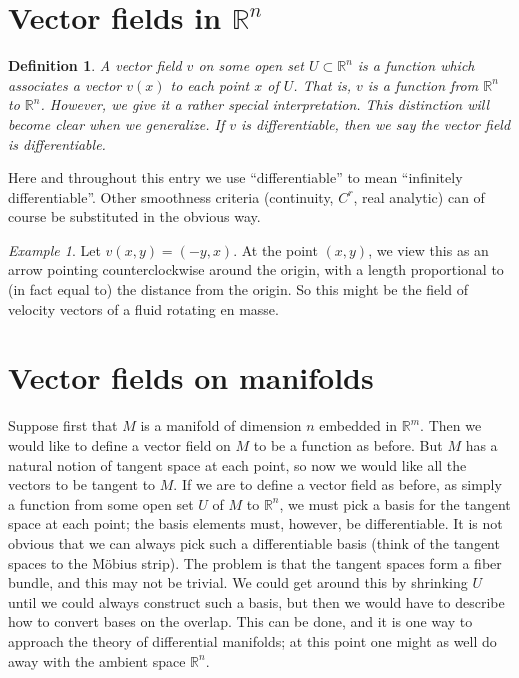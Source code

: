 \documentclass{article}
\newtheorem*{defn}{Definition}
\theoremstyle{remark}
\newtheorem*{example}{Example}
\begin{document}
\section*{Vector fields in $\mathbb{R}^n$}

\begin{defn}
A \emph{vector field} $v$ on some open set $U \subset \mathbb{R}^n$ is a function which associates a vector $v(x)$ to each point $x$ of $U$. That is, $v$ is a function from $\mathbb{R}^n$ to $\mathbb{R}^n$.  However, we give it a rather special interpretation.  This distinction will become clear when we generalize.  If $v$ is differentiable, then we say the vector field is \emph{differentiable}.
\end{defn}

Here and throughout this entry we use ``differentiable'' to mean ``infinitely differentiable''.  Other smoothness criteria (continuity, $C^r$, real analytic) can of course be substituted in the obvious way.

\begin{example}
Let $v(x,y)=(-y,x)$.  At the point $(x,y)$, we view this as an arrow pointing counterclockwise around the origin, with a length proportional to (in fact equal to) the distance from the origin.  So this might be the field of velocity vectors of a fluid rotating en masse.
\end{example}

\section*{Vector fields on manifolds}

Suppose first that $M$ is a manifold of dimension $n$ embedded in $\mathbb{R}^m$.  Then we would like to define a vector field on $M$ to be a function as before.  But $M$ has a natural notion of tangent space at each point, so now we would like all the vectors to be tangent to $M$.  If we are to define a vector field as before, as simply a function from some open set $U$ of $M$ to $\mathbb{R}^n$, we must pick a basis for the tangent space at each point; the basis elements must, however, be differentiable.  It is not obvious that we can always pick such a differentiable basis (think of the tangent spaces to the M\"obius strip).  The problem is that the tangent spaces form a fiber bundle, and this may not be trivial.  We could get around this by shrinking $U$ until we could always construct such a basis, but then we would have to describe how to convert bases on the overlap.  This can be done, and it is one way to approach the theory of differential manifolds; at this point one might as well do away with the ambient space $\mathbb{R}^n$.
\end{document}
